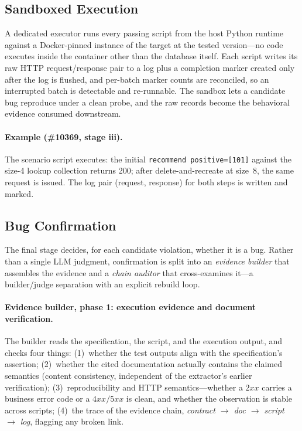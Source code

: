 \documentclass[acmsmall,screen,review,anonymous]{acmart}
\begin{document}
\subsection{Sandboxed Execution}
\label{subsec:execution}

A dedicated executor runs every passing script from the host Python runtime against a Docker-pinned instance of the target at the tested version---no code executes inside the container other than the database itself. Each script writes its raw HTTP request/response pair to a log plus a completion marker created only after the log is flushed, and per-batch marker counts are reconciled, so an interrupted batch is detectable and re-runnable. The sandbox lets a candidate bug reproduce under a clean probe, and the raw records become the behavioral evidence consumed downstream.

\paragraph{Example (\#10369, stage iii).}
The scenario script executes: the initial \texttt{recommend positive=[101]} against the size-4 lookup collection returns 200; after delete-and-recreate at size~8, the same request is issued. The log pair (request, response) for both steps is written and marked.

\subsection{Bug Confirmation}
\label{subsec:confirmation}

The final stage decides, for each candidate violation, whether it is a bug. Rather than a single LLM judgment, confirmation is split into an \emph{evidence builder} that assembles the evidence and a \emph{chain auditor} that cross-examines it---a builder/judge separation with an explicit rebuild loop.

\paragraph{Evidence builder, phase 1: execution evidence and document verification.}
The builder reads the specification, the script, and the execution output, and checks four things: (1)~whether the test outputs align with the specification's assertion; (2)~whether the cited documentation actually contains the claimed semantics (content consistency, independent of the extractor's earlier verification); (3)~reproducibility and HTTP semantics---whether a $2xx$ carries a business error code or a $4xx/5xx$ is clean, and whether the observation is stable across scripts; (4)~the trace of the evidence chain, \emph{contract $\rightarrow$ doc $\rightarrow$ script $\rightarrow$ log}, flagging any broken link.
\end{document}
